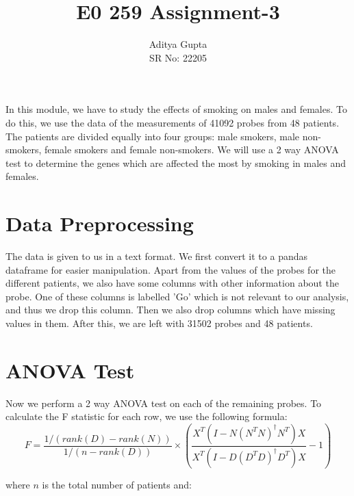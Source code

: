 \documentclass[12pt]{article}
\title{\vspace{-1.5cm}E0 259 Assignment-3}
\author{Aditya Gupta \\
SR No: 22205}
\date{}
\begin{document}
\maketitle

In this module, we have to study the effects of smoking on males and females. To do this, we use the data of the measurements of 41092 probes from 48 patients. The patients are divided equally into four groups: male smokers, male non-smokers, female smokers and female non-smokers. We will use a 2 way ANOVA test to determine the genes which are affected the most by smoking in males and females.

\section*{Data Preprocessing}
The data is given to us in a text format. We first convert it to a pandas dataframe for easier manipulation. Apart from the values of the probes for the different patients, we also have some columns with other information about the probe. One of these columns is labelled 'Go' which is not relevant to our analysis, and thus we drop this column. Then we also drop columns which have missing values in them. After this, we are left with 31502 probes and 48 patients. 

\section*{ANOVA Test}
Now we perform a 2 way ANOVA test on each of the remaining probes. To calculate the F statistic for each row, we use the following formula:
\begin{equation*}
    F = \frac{1/(rank(D) - rank(N))}{1/(n - rank(D))} \times \left( \frac{X^T(I - N(N^T N)^{\dagger}N^T)X}{X^T(I - D(D^T D)^{\dagger}D^T)X} - 1 \right)
\end{equation*}

where $n$ is the total number of patients and:
\end{document}
